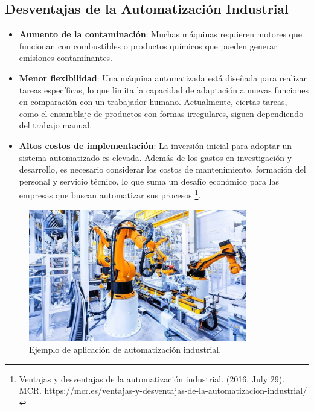 \subsection{Desventajas de la Automatización Industrial}

\begin{itemize}
    \item \textbf{Aumento de la contaminación}: Muchas máquinas requieren motores que funcionan con combustibles o productos químicos que pueden generar emisiones contaminantes.
    
    \item \textbf{Menor flexibilidad}: Una máquina automatizada está diseñada para realizar tareas específicas, lo que limita la capacidad de adaptación a nuevas funciones en comparación con un trabajador humano. Actualmente, ciertas tareas, como el ensamblaje de productos con formas irregulares, siguen dependiendo del trabajo manual.
    
    \item \textbf{Altos costos de implementación}: La inversión inicial para adoptar un sistema automatizado es elevada. Además de los gastos en investigación y desarrollo, es necesario considerar los costos de mantenimiento, formación del personal y servicio técnico, lo que suma un desafío económico para las empresas que buscan automatizar sus procesos \footnote{ Ventajas y desventajas de la automatización industrial. (2016, July 29). MCR.  \url{ https://mcr.es/ventajas-y-desventajas-de-la-automatizacion-industrial/}}.
\end{itemize}

\begin{figure} [h!]
  \begin{center}
    \includegraphics[width=9.5cm]{figs/automatizacion_industrial.jpg}
  \end{center}
  \caption{\centering Ejemplo de aplicación de automatización industrial.}
  \label{fig:automatizacion_industrial}
\end{figure}

